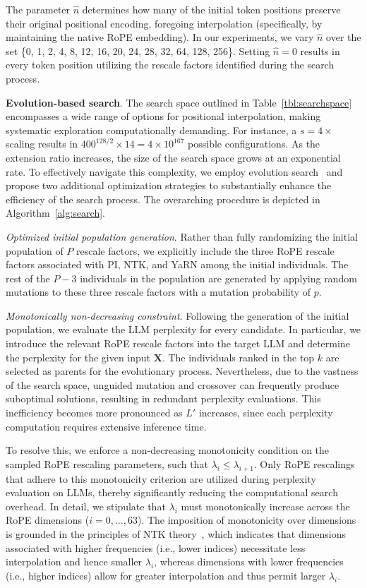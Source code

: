 The parameter $\hat{n}$ determines how many of the initial token positions preserve their original positional encoding, foregoing interpolation (specifically, by maintaining the native RoPE embedding). In our experiments, we vary $\hat{n}$ over the set \{0, 1, 2, 4, 8, 12, 16, 20, 24, 28, 32, 64, 128, 256\}. Setting $\hat{n}=0$ results in every token position utilizing the rescale factors identified during the search process.

\textbf{Evolution-based search}. The search space outlined in Table~\ref{tbl:searchspace} encompasses a wide range of options for positional interpolation, making systematic exploration computationally demanding. For instance, a $s=4\times$ scaling results in $400^{128/2}\times14 = 4\times10^{167}$ possible configurations. As the extension ratio increases, the size of the search space grows at an exponential rate. To effectively navigate this complexity, we employ evolution search~\cite{guo2020single} and propose two additional optimization strategies to substantially enhance the efficiency of the search process. The overarching procedure is depicted in Algorithm~\ref{alg:search}.

\textit{Optimized initial population generation}. Rather than fully randomizing the initial population of $P$ rescale factors, we explicitly include the three RoPE rescale factors associated with PI, NTK, and YaRN among the initial individuals. The rest of the $P-3$ individuals in the population are generated by applying random mutations to these three rescale factors with a mutation probability of $p$.

\textit{Monotonically non-decreasing constraint}. Following the generation of the initial population, we evaluate the LLM perplexity for every candidate. In particular, we introduce the relevant RoPE rescale factors into the target LLM and determine the perplexity for the given input $\mathbf{X}$. The individuals ranked in the top $k$ are selected as parents for the evolutionary process. Nevertheless, due to the vastness of the search space, unguided mutation and crossover can frequently produce suboptimal solutions, resulting in redundant perplexity evaluations. This inefficiency becomes more pronounced as $L'$ increases, since each perplexity computation requires extensive inference time.

To resolve this, we enforce a non-decreasing monotonicity condition on the sampled RoPE rescaling parameters, such that $\lambda_i \le \lambda_{i+1}$. Only RoPE rescalings that adhere to this monotonicity criterion are utilized during perplexity evaluation on LLMs, thereby significantly reducing the computational search overhead. In detail, we stipulate that $\lambda_i$ must monotonically increase across the RoPE dimensions ($i=0,...,63$). The imposition of monotonicity over dimensions is grounded in the principles of NTK theory~\cite{jacot2018neural,tancik2020fourier,ntk}, which indicates that dimensions associated with higher frequencies (i.e., lower indices) necessitate less interpolation and hence smaller $\lambda_i$, whereas dimensions with lower frequencies (i.e., higher indices) allow for greater interpolation and thus permit larger $\lambda_i$.

